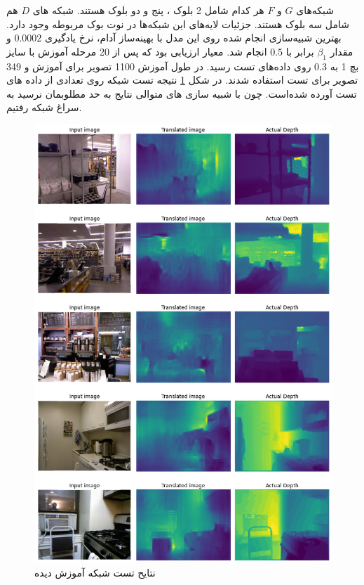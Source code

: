 \documentclass[12pt,a4paper]{report}
\begin{document}
شبکه‌های $G$ و $F$ هر کدام شامل
2 بلوک ، پنج  و دو بلوک 
هستند. شبکه های $D$ هم شامل سه بلوک  هستند.
جزئیات لایه‌های این شبکه‌ها در نوت بوک مربوطه وجود دارد.
بهترین شبیه‌سازی انجام شده
روی این مدل با بهینه‌ساز آدام، نرخ یادگیری $0.0002$
و مقدار $\beta_1$ برابر با $0.5$ انجام شد.
معیار ارزیابی 
بود که پس از 20 مرحله آموزش با سایز بچ 1 به $0.3$
روی داده‌های تست رسید.
در طول آموزش 1100 تصویر برای آموزش و 349 تصویر برای تست استفاده شدند.
در شکل \ref{cg_test} نتیجه تست شبکه روی تعدادی از داده های تست آورده شده‌است.
چون با شبیه سازی های متوالی نتایج به حد مطلوبمان نرسید به سراغ شبکه  رفتیم.
\begin{figure}
  \centering
  \includegraphics[width=.5\textwidth]{Images//cg3.png}
  \caption{نتایح تست شبکه  آموزش دیده}\label{cg_test}
\end{figure}
\end{document}
